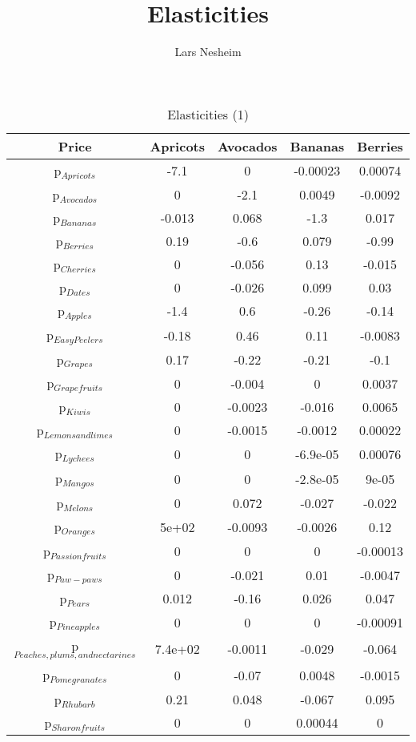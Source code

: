\documentclass[11pt]{article}
\title{Elasticities}
\author{Lars Nesheim}
\date{}
\begin{document}
\maketitle
\begin{table}[h]
\caption{Elasticities (1)}
\label{Table: elasticities 1}
\begin{center}
\begin{tabular}{ccccc}
Price & Apricots & Avocados & Bananas & Berries \\ \hline
p$_{Apricots}$ & -7.1 & 0 & -0.00023 & 0.00074 \\ 
p$_{Avocados}$ & 0 & -2.1 & 0.0049 & -0.0092 \\ 
p$_{Bananas}$ & -0.013 & 0.068 & -1.3 & 0.017 \\ 
p$_{Berries}$ & 0.19 & -0.6 & 0.079 & -0.99 \\ 
p$_{Cherries}$ & 0 & -0.056 & 0.13 & -0.015 \\ 
p$_{Dates}$ & 0 & -0.026 & 0.099 & 0.03 \\ 
p$_{Apples}$ & -1.4 & 0.6 & -0.26 & -0.14 \\ 
p$_{Easy Peelers}$ & -0.18 & 0.46 & 0.11 & -0.0083 \\ 
p$_{Grapes}$ & 0.17 & -0.22 & -0.21 & -0.1 \\ 
p$_{Grapefruits}$ & 0 & -0.004 & 0 & 0.0037 \\ 
p$_{Kiwis}$ & 0 & -0.0023 & -0.016 & 0.0065 \\ 
p$_{Lemons and limes}$ & 0 & -0.0015 & -0.0012 & 0.00022 \\ 
p$_{Lychees}$ & 0 & 0 & -6.9e-05 & 0.00076 \\ 
p$_{Mangos}$ & 0 & 0 & -2.8e-05 & 9e-05 \\ 
p$_{Melons}$ & 0 & 0.072 & -0.027 & -0.022 \\ 
p$_{Oranges}$ & 5e+02 & -0.0093 & -0.0026 & 0.12 \\ 
p$_{Passion fruits}$ & 0 & 0 & 0 & -0.00013 \\ 
p$_{Paw-paws}$ & 0 & -0.021 & 0.01 & -0.0047 \\ 
p$_{Pears}$ & 0.012 & -0.16 & 0.026 & 0.047 \\ 
p$_{Pineapples}$ & 0 & 0 & 0 & -0.00091 \\ 
p$_{Peaches, plums, and nectarines}$ & 7.4e+02 & -0.0011 & -0.029 & -0.064 \\ 
p$_{Pomegranates}$ & 0 & -0.07 & 0.0048 & -0.0015 \\ 
p$_{Rhubarb}$ & 0.21 & 0.048 & -0.067 & 0.095 \\ 
p$_{Sharon fruits}$ & 0 & 0 & 0.00044 & 0 \\ 
\end{tabular}
\end{center}
\end{table}
\end{document}
